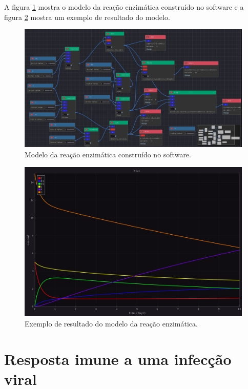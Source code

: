 \documentclass[
	12pt,				%
	openright,			%
	oneside,			%
	a4paper,			%
	main=brazil,
	english,			%
	]{ufsj-abntex2}
\begin{document}
A figura \ref{fig:reacaoenzimatica} mostra o modelo da reação enzimática construído no software e a figura \ref{fig:resultado-reacaoenzimatica} mostra um exemplo de resultado do modelo.  

\begin{figure}[h]
    \centering
    \includegraphics[width=\textwidth]{imgs/modelos/reacaoenzimatica.png} 
    \caption{Modelo da reação enzimática construído no software.}
    \label{fig:reacaoenzimatica}
\end{figure}

\begin{figure}[h]
    \centering
    \includegraphics[width=\textwidth]{imgs/modelos/resultado-reacaoenzimatica.png} 
    \caption{Exemplo de resultado do modelo da reação enzimática.}
    \label{fig:resultado-reacaoenzimatica}
\end{figure}
    
\section{Resposta imune a uma infecção viral}
\end{document}
